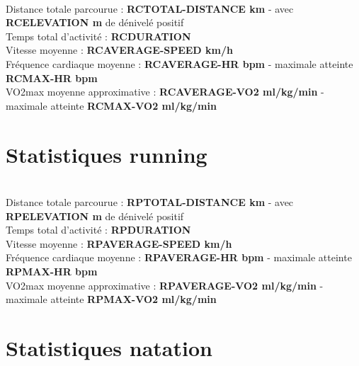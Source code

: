\documentclass[a4paper,french,11pt]{report}
\begin{document}
\\
\textbullet Distance totale parcourue : \textbf{RCTOTAL-DISTANCE km} - avec \textbf{RCELEVATION m} de dénivelé positif\\
\textbullet Temps total d'activité : \textbf{RCDURATION} \\
\textbullet Vitesse moyenne : \textbf{RCAVERAGE-SPEED km/h} \\
\textbullet Fréquence cardiaque moyenne : \textbf{RCAVERAGE-HR bpm} - maximale atteinte \textbf{RCMAX-HR bpm}\\
\textbullet VO2max moyenne approximative : \textbf{RCAVERAGE-VO2 ml/kg/min} - maximale atteinte \textbf{RCMAX-VO2 ml/kg/min}\\


\section*{Statistiques running}
\thispagestyle{empty}


\\
\textbullet Distance totale parcourue : \textbf{RPTOTAL-DISTANCE km} - avec \textbf{RPELEVATION m} de dénivelé positif\\
\textbullet Temps total d'activité : \textbf{RPDURATION} \\
\textbullet Vitesse moyenne : \textbf{RPAVERAGE-SPEED km/h}\\
\textbullet Fréquence cardiaque moyenne : \textbf{RPAVERAGE-HR bpm} - maximale atteinte \textbf{RPMAX-HR bpm}\\
\textbullet VO2max moyenne approximative : \textbf{RPAVERAGE-VO2 ml/kg/min} - maximale atteinte \textbf{RPMAX-VO2 ml/kg/min}\\


\section*{Statistiques natation}
\thispagestyle{empty}
\end{document}

